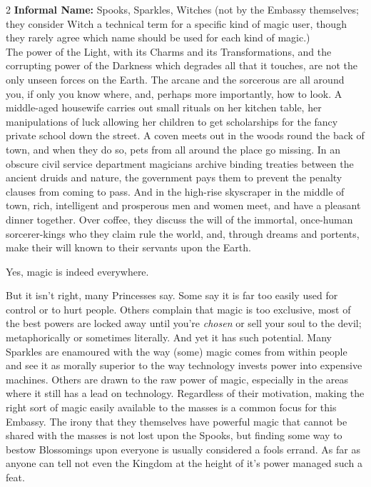 \begin{multicols}{2}
\noindent \textbf{Informal Name:} Spooks, Sparkles, Witches (not by the Embassy themselves; they consider Witch a technical term for a specific kind of magic user, though they rarely agree which name should be used for each kind of magic.) \\

\noindent The power of the Light, with its Charms and its Transformations, and the corrupting power of the Darkness which degrades all that it touches, are not the only unseen forces on the Earth. The arcane and the sorcerous are all around you, if only you know where, and, perhaps more importantly, how to look. A middle-aged housewife carries out small rituals on her kitchen table, her manipulations of luck allowing her children to get scholarships for the fancy private school down the street. A coven meets out in the woods round the back of town, and when they do so, pets from all around the place go missing. In an obscure civil service department magicians archive binding treaties between the ancient druids and nature, the government pays them to prevent the penalty clauses from coming to pass. And in the high-rise skyscraper in the middle of town, rich, intelligent and prosperous men and women meet, and have a pleasant dinner together. Over coffee, they discuss 
the will of the immortal, once-human sorcerer-kings who they claim rule the world, and, through dreams and portents, make their will known to their servants upon the Earth.

Yes, magic is indeed everywhere.

But it isn't right, many Princesses say. Some say it is far too easily used for control or to hurt people. Others complain that magic is too exclusive, most of the best powers are locked away until you're \textit{chosen} or sell your soul to the devil; metaphorically or sometimes literally. And yet it has such potential. Many Sparkles are enamoured with the way (some) magic comes from within people and see it as morally superior to the way technology invests power into expensive machines. Others are drawn to the raw power of magic, especially in the areas where it still has a lead on technology. Regardless of their motivation, making the right sort of magic easily available to the masses is a common focus for this Embassy. The irony that they themselves have powerful magic that cannot be shared with the masses is not lost upon the Spooks, but finding some way to bestow Blossomings upon everyone is usually considered a fools errand. As far as anyone can tell not even the Kingdom at the height of it's power 
managed such a feat. 


\end{multicols}
